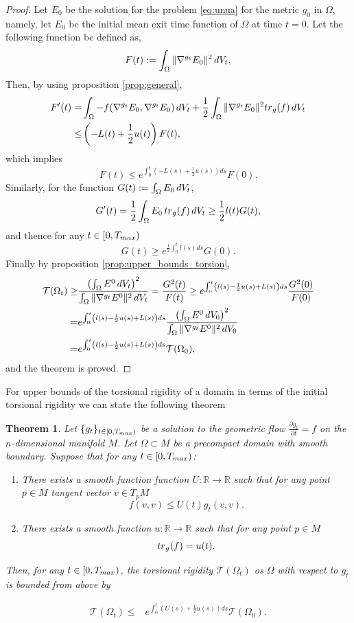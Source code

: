 \documentclass{amsart}
\newtheorem{theorem}{Theorem}[section]
\theoremstyle{definition}
\theoremstyle{remark}
\newcommand{\tr}{{\rm tr}}
\newcommand{\V}{{\rm V}}
\begin{document}
\begin{proof}
  Let $E_0$ be the solution for the problem \eqref{eq:unua} for the metric $g_0$ in $\Omega$, namely, let $E_0$ be the initial mean exit time function of $\Omega$ at time $t=0$. Let the following function be defined as,
$$
F(t):=\int_\Omega\Vert \nabla^{g_t} E_0\Vert^2\, d\V_t ,
$$
Then, by using proposition \ref{prop:general},
$$
\begin{aligned}
F'(t)=&\int_\Omega -f(\nabla^{g_t} E_0, \nabla^{g_t} E_0)\, d\V_t+ \frac{1}{2}\int_\Omega\Vert \nabla^{g_t} E_0\Vert^2 \tr_g(f)\, d\V_t\\
\leq &\left(-L(t)+\frac{1}{2} u(t)\right) F(t),
\end{aligned}
$$
which implies 
$$
F(t)\leq e^{\int_0^t\left(-L(s)+\frac{1}{2} u(s)\right)ds}F(0).
$$
Similarly, for the function
$
G(t):=\int_\Omega E_0\, d\V_t
$,
$$
G'(t)=\frac{1}{2}\int_\Omega E_0 \, \tr_g(f)\, d\V_t\geq\frac{1}{2}l(t) G(t),
$$
and thence for any $t\in [0,T_{\rm max})$
$$
G(t)\geq e^{\frac{1}{2}\int_0^tl(s)ds}G(0).
$$
Finally by proposition \ref{prop:upper_bounds_torsion},
$$
\begin{aligned}
    \mathcal{T}(\Omega_t)\geq&\frac{\left(\int_\Omega E^0\, d\V_t\right)^2}{\int_\Omega \Vert \nabla^{g_t}E^0\Vert^2\, d\V_t}= \frac{G^2(t)}{F(t)}\geq e^{\int_0^t\left(l(s)-\frac{1}{2}u(s)+L(s)\right)ds} \frac{G^2(0)}{F(0)}\\
    =&e^{\int_0^t\left(l(s)-\frac{1}{2}u(s)+L(s)\right)ds} \frac{\left(\int_\Omega E^0\, d\V_0\right)^2}{\int_\Omega \Vert \nabla^{g_t}E^0\Vert^2\, d\V_0}\\
    =&e^{\int_0^t\left(l(s)-\frac{1}{2}u(s)+L(s)\right)ds}\mathcal{T}(\Omega_0),
\end{aligned}
$$
and the theorem is proved.
\end{proof}
For upper bounds of the torsional rigidity of a domain in terms of the initial torsional rigidity we can state the following theorem
\begin{theorem}\label{teo:upper}
    Let $\{g_t\}_{t\in [0,T_{\rm max})}$ be a solution to the geometric flow $\frac{\partial g_t}{\partial t}=f$ on the $n$-dimensional manifold $M$. Let $\Omega \subset M$ be a precompact domain with smooth boundary. Suppose that  for any $t\in [0,T_{\rm max})$:
    \begin{enumerate}
        \item There exists a smooth function function $U:\mathbb{R}\to \mathbb{R}$ such that for any point $p\in M$ tangent vector $v\in T_pM$
        $$
f(v,v)\leq U(t) g_t(v,v).
        $$
        \item There exists a smooth function $u:\mathbb{R}\to\mathbb{R}$ such that for any point $p\in M$
        $$
  \tr_g(f)= u(t).
        $$
    \end{enumerate}
    
    Then, for any $t\in [0, T_{\rm max})$, the torsional rigidity $\mathcal{T}(\Omega_t)$ os $\Omega$ with respect to $g_t$ is bounded from above by
  
$$
\begin{aligned}
    \mathcal{T}(\Omega_t)\leq&
e^{\int_0^t\left(U(s)+\frac{1}{2}u(s)\right)ds}\mathcal{T}(\Omega_0).
\end{aligned}
$$
\end{theorem}
\end{document}
